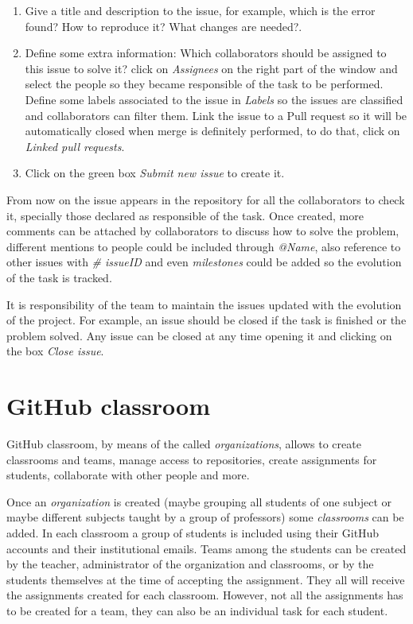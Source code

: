 \begin{enumerate}
\setlength\itemsep{0.0cm}
\item Give a title and description to the issue, for example, which is the error found? How to reproduce it? What changes are needed?.
\item Define some extra information:
    Which collaborators should be assigned to this issue to solve it? click on \textit{Assignees} on the right part of the window and select the people so they became responsible of the task to be performed. 
    Define some labels associated to the issue in \textit{Labels} so the issues are classified and collaborators can filter them. 
    Link the issue to a Pull request so it will be automatically closed when merge is definitely performed, to do that, click on \textit{Linked pull requests}.   
\item Click on the green box \textit{Submit new issue} to create it.
\end{enumerate}

From now on the issue appears in the repository for all the collaborators to check it, specially those declared as responsible of the task. 
Once created, more comments can be attached by collaborators to discuss how to solve the problem, 
different mentions to people could be included through \textit{@Name}, 
also reference to other issues with \textit{\# issueID} and
even \textit{milestones} could be added so the evolution of the task is tracked. 

It is responsibility of the team to maintain the issues updated with the evolution of the project. 
For example, an issue should be closed if the task is finished or the problem solved. 
Any issue can be closed at any time opening it and clicking on the box \textit{Close issue}. 




\section{GitHub classroom}

GitHub classroom, by means of the called \textit{organizations}, allows to create classrooms and teams, manage access to repositories, create assignments for students, collaborate with other people and more. 

Once an \textit{organization} is created (maybe grouping all students of one subject or maybe different subjects taught by a group of professors) some \textit{classrooms} can be added. 
In each classroom a group of students is included using their GitHub accounts and their institutional emails.
Teams among the students can be created by the teacher, administrator of the organization and classrooms, or by the students themselves at the time of accepting the assignment. 
They all will receive the assignments created for each classroom.  
However, not all the assignments has to be created for a team, they can also be an individual task for each student. 

